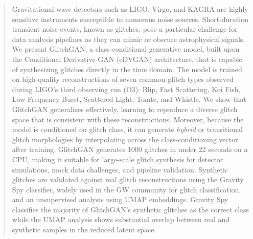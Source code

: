 \documentclass[reprint,nofootinbib,amsmath,amssymb,aps,floatfix]{revtex4-2}
\begin{document}
\begin{abstract}
Gravitational-wave detectors such as LIGO, Virgo, and KAGRA are highly sensitive instruments susceptible to numerous noise sources. 
Short-duration transient noise events, known as glitches, pose a particular challenge for data analysis pipelines as they can mimic or obscure astrophysical signals. 
We present GlitchGAN, a class-conditional generative model, built upon the Conditional Derivative GAN (cDVGAN) architecture, that is capable of synthesizing glitches directly in the time domain. 
The model is trained on high-quality reconstructions of seven common glitch types observed during LIGO's third observing run (O3): Blip, Fast Scattering, Koi Fish, Low-Frequency Burst, Scattered Light, Tomte, and Whistle.
We show that GlitchGAN generalizes effectively, learning to reproduce a diverse glitch space that is consistent with these reconstructions. 
Moreover, because the model is conditioned on glitch class, it can generate \textit{hybrid} or transitional glitch morphologies by interpolating across the class-conditioning vector after training.
GlitchGAN generates 1000 glitches in under 22 seconds on a CPU, making it suitable for large-scale glitch synthesis for detector simulations, mock data challenges, and pipeline validation.
Synthetic glitches are validated against real glitch reconstructions using the Gravity Spy classifier, widely used in the GW community for glitch classification, and an unsupervised analysis using UMAP embeddings. 
Gravity Spy classifies the majority of GlitchGAN's synthetic glitches as the correct class while the UMAP analysis shows substantial overlap between real and synthetic samples in the reduced latent space. 

\end{abstract}
\end{document}
